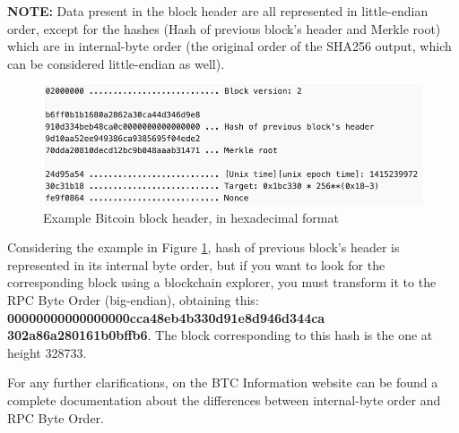 \noindent \textbf{NOTE:} Data present in the block header are all represented in little-endian order, except for the hashes (Hash of previous block's header and Merkle root) which are in internal-byte order (the original order of the SHA256 output, which can be considered little-endian as well).\\

\begin{figure}[h!]
    \centering
    \includegraphics[width=15cm]{Figures/getwork/getwork3.png}
    \caption{Example Bitcoin block header, in hexadecimal format}
    \label{fig:getwork3}
\end{figure}

\noindent Considering the example in Figure \ref{fig:getwork3}, hash of previous block's header is represented in its internal byte order, but if you want to look for the corresponding block using a blockchain explorer, you must transform it to the RPC Byte Order (big-endian), obtaining this: \textbf{00000000000000000cca48eb4b330d91e8d946d344ca\\302a86a280161b0bffb6}.
The block corresponding to this hash is the one at height 328733. \cite{block328733} 

\noindent For any further clarifications, on the BTC Information website can be found a complete documentation about the differences between internal-byte order and RPC Byte Order. \cite{btcinformationByteOrder} 